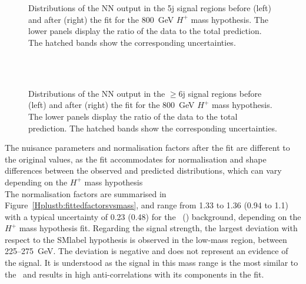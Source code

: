 \begin{figure}[htb]
    \RawFloats
    \centering
    \\
    \\
    \caption{Distributions of the NN output in the 5j signal regions before (left) and after (right) the fit for the 800~GeV $H^+$ mass hypothesis. The lower panels display the ratio of the data to the total prediction. The hatched bands show the corresponding uncertainties.
    }
    \label{Hplustb:prepost8005j}
\end{figure}

\begin{figure}[htb]
    \RawFloats
    \centering
    \\
    \\
    \caption{Distributions of the NN output in the $\geq$6j signal regions before (left) and after (right) the fit for the 800~GeV $H^+$ mass hypothesis. The lower panels display the ratio of the data to the total prediction. The hatched bands show the corresponding uncertainties.
    }
    \label{Hplustb:prepost8006j}
\end{figure}
\clearpage

The nuisance parameters and normalisation factors after the fit are different to the original values, as the fit accommodates for normalisation and shape differences between the observed and predicted distributions, which can vary depending on the $H^+$ mass hypothesis\\

The normalisation factors are summarised in Figure~\ref{Hplustb:fittedfactorsvsmass}, and range from 1.33 to 1.36 (0.94 to 1.1) with a typical uncertainty of 0.23 (0.48) for the \ttb\ (\ttc) background, depending on the $H^+$ mass hypothesis fit. Regarding the signal strength, the largest deviation with respect to the \acrshort{SMlabel} hypothesis is observed in the low-mass region, between 225--275~GeV. The deviation is negative and does not represent an evidence of the signal. It is understood as the signal in this mass range is the most similar to the \ttHF\ and results in high anti-correlations with its components in the fit.\\

